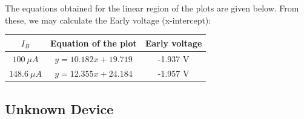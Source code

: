\documentclass[12pt]{article}
\begin{document}
The equations obtained for the linear region of the plots are given below. From these, we may calculate the Early voltage (x-intercept):
\begin{center}
 \begin{tabular}{|| c | c || c ||} 
 \hline
 \hline
\( I_B \) & Equation of the plot & Early voltage \\ [0.25ex] 
 \hline\hline
 \hline 
\( 100\ \mu A \) & \( y = 10.182 x + 19.719 \) & -1.937 V \\ \hline
\( 148.6\ \mu A \) & \( y = 12.355 x + 24.184 \) & -1.957 V \\ \hline
\end{tabular}
\end{center}

\subsection{Unknown Device}
\end{document}
